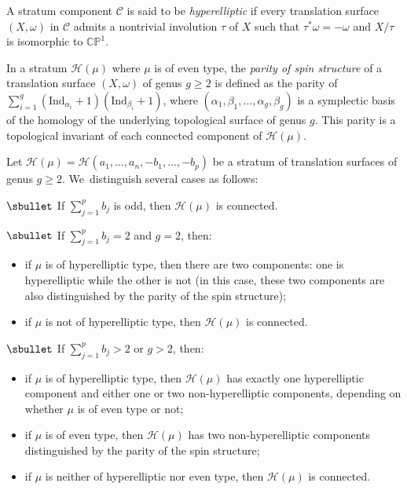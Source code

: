 \begin{defn}
A stratum component $\mathcal{C}$ is said to be \textit{hyperelliptic} if every translation surface $(X,\omega)$ in $\mathcal{C}$ admits a nontrivial involution $\tau$ of $X$ such that $\tau^{\ast} \omega = -\omega$ and $X / \tau$ is isomorphic to $\mathbb{CP}^{1}$.
\end{defn}

\begin{defn}
In a stratum $\mathcal{H}(\mu)$ where $\mu$ is of even type, the \textit{parity of spin structure} of a translation surface $(X,\omega)$ of genus $g \geq 2$ is defined as the parity of $\sum_{i=1}^{g} (\mathrm{Ind}_{\alpha_{i}}+1)(\mathrm{Ind}_{\beta_{i}}+1)$, where $(\alpha_{1},\beta_{1},\dots,\alpha_{g},\beta_{g})$ is a symplectic basis of the homology of the underlying topological surface of genus $g$. This parity is a topological invariant of each connected component of $\mathcal{H}(\mu)$.
\end{defn}

\begin{thm}\label{thm:BoissyHigherGenus}
Let $\mathcal{H}(\mu)=\mathcal{H}(a_{1},\dots,a_{n},-b_{1},\dots,-b_{p})$ be a stratum of translation surfaces of genus $g \geq 2$. We~distinguish several cases as follows:

$\sbullet$ If $\sum_{j=1}^p b_{j}$ is odd, then $\mathcal{H}(\mu)$ is connected.

$\sbullet$ If $\sum_{j=1}^p b_{j} =2$ and $g=2$, then:
\begin{itemize}
\item if $\mu$ is of hyperelliptic type, then
there are two components: one is hyperelliptic while the other is not (in this case, these two components are also distinguished by the parity of the spin structure);
\item if $\mu$ is not of hyperelliptic type, then $\mathcal{H}(\mu)$ is connected.
\end{itemize}

$\sbullet$ If $\sum_{j=1}^p b_{j} >2$ or $g>2$, then:
\begin{itemize}
\item if $\mu$ is of hyperelliptic type, then $\mathcal{H}(\mu)$ has exactly one hyperelliptic component and either one or two non-hyperelliptic components, depending on whether $\mu$ is of even type or not;
\item if $\mu$ is of even type, then $\mathcal{H}(\mu)$ has two non-hyperelliptic components distinguished by the parity of the spin structure;
\item if $\mu$ is neither of hyperelliptic nor even type, then $\mathcal{H}(\mu)$ is connected.
\end{itemize}
\end{thm}

